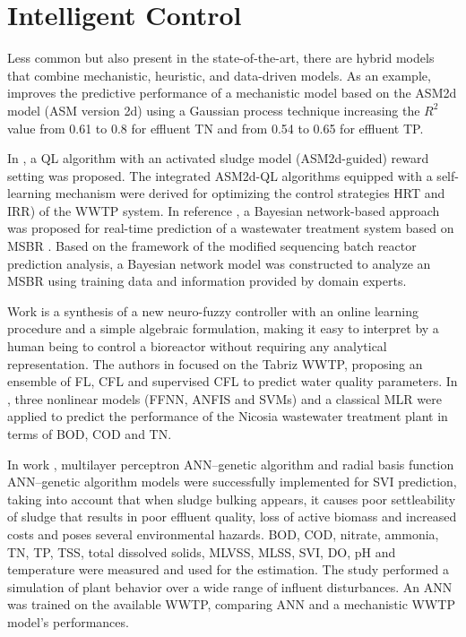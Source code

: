 \section{Intelligent Control}
\label{s:RelatedWorks-Control}

Less common but also present in the state-of-the-art, there are hybrid models that combine mechanistic, heuristic, and data-driven models. As an example, \cite{Hvala2020} improves the predictive performance of a mechanistic model based on the ASM2d model (\ac{ASM} version 2d) using a Gaussian process technique increasing the \begin{math}R^2\end{math} value from 0.61 to 0.8 for effluent \ac{TN} and from 0.54 to 0.65 for effluent \ac{TP}.

In \cite{Pang2019}, a \ac{QL} algorithm with an activated sludge model (\ac{ASM}2d-guided) reward setting was proposed. The integrated \ac{ASM}2d-QL algorithms equipped with a self-learning mechanism were derived for optimizing the control strategies \ac{HRT} and \ac{IRR}) of the \ac{WWTP} system. In reference \cite{Li2013}, a Bayesian network-based approach was proposed for real-time prediction of a wastewater treatment system based on \ac{MSBR} . Based on the framework of the modified sequencing batch reactor prediction analysis, a Bayesian network model was constructed to analyze an \ac{MSBR} using training data and information provided by domain experts.

Work \cite{Haggege2005} is a synthesis of a new neuro-fuzzy controller with an online learning procedure and a simple algebraic formulation, making it easy to interpret by a human being to control a bioreactor without requiring any analytical representation. The authors in \cite{Nadiri2018} focused on the Tabriz \ac{WWTP}, proposing an ensemble of \ac{FL}, \ac{CFL}  and supervised \ac{CFL} to predict water quality parameters. In \cite{Nourani2018}, three nonlinear models (\ac{FFNN}, \ac{ANFIS} and \ac{SVM}s) and a classical \ac{MLR} were applied to predict the performance of the Nicosia wastewater treatment plant in terms of \ac{BOD}, \ac{COD} and \ac{TN}. 

In work \cite{Bagheri2015}, multilayer perceptron \ac{ANN}–genetic algorithm and radial basis function \ac{ANN}–genetic algorithm  models were successfully implemented for \ac{SVI} prediction, taking into account that when sludge bulking appears, it causes poor settleability of sludge that results in poor effluent quality, loss of active biomass and increased costs and poses several environmental hazards. \ac{BOD}, \ac{COD}, nitrate, ammonia, \ac{TN}, \ac{TP}, \ac{TSS}, total dissolved solids, \ac{MLVSS}, \ac{MLSS}, \ac{SVI}, \ac{DO}, pH and temperature were measured and used for the estimation. The study \cite{Raduly2007} performed a simulation of plant behavior over a wide range of influent disturbances. An \ac{ANN} was trained on the available \ac{WWTP}, comparing \ac{ANN} and a mechanistic \ac{WWTP} model’s performances.

